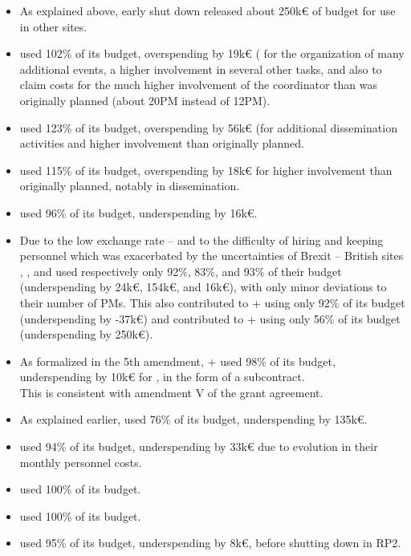 \begin{itemize}
\item As explained above,  early shut down released about
  250k€ of budget for use in other sites.
\item {} used 102\% of its budget, overspending by 19k€ ( for the organization of many
  additional events, a higher involvement in several other tasks, and
  also to claim costs for the much higher involvement of the
  coordinator than was originally planned (about 20PM instead of
  12PM).
\item {} used 123\% of its budget, overspending by 56k€ (for additional dissemination
  activities and higher involvement than originally planned.
\item {} used 115\% of its budget, overspending by 18k€ for
  higher involvement than originally planned, notably in
  dissemination.
\item {} used 96\% of its budget, underspending by 16k€.
\item Due to the low exchange rate -- and to the difficulty of hiring
  and keeping personnel which was exacerbated by the uncertainties of
  Brexit -- British sites , , and  used
  respectively only 92\%, 83\%, and 93\% of their budget
  (underspending by 24k€, 154k€, and 16k€), with only minor deviations
  to their number of PMs. This also contributed to
  + using only 92\% of its budget (underspending
  by -37k€) and contributed to + using only 56\%
  of its budget (underspending by 250k€).
\item As formalized in the 5th amendment, + used
  98\% of its budget, underspending by 10k€ for
  , in the form of a subcontract.\\
  This is consistent with amendment V of the grant agreement.
\item As explained earlier,  used 76\% of its budget,
  underspending by 135k€.
\item {} used 94\% of its budget, underspending by 33k€ 
due to evolution in their monthly personnel costs.
\item {} used 100\% of its budget.
\item {} used 100\% of its budget.
\item {} used 95\% of its budget, underspending by 8k€, before
  shutting down in RP2.
\end{itemize}


